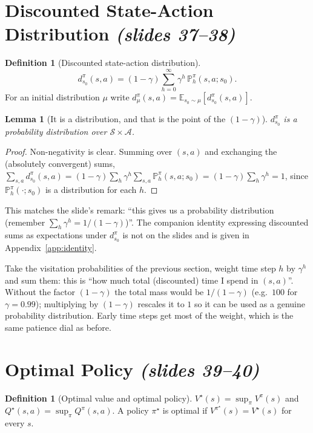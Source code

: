 \documentclass[11pt,a4paper]{article}
\newcommand{\E}{\mathbb{E}}
\newcommand{\PP}{\mathbb{P}}
\newcommand{\slr}[1]{\texorpdfstring{\emph{(slides #1)}}{(slides #1)}}
\newcommand{\cS}{\mathcal{S}}
\newcommand{\cA}{\mathcal{A}}
\theoremstyle{plain}
\newtheorem{lemma}[theorem]{Lemma}
\theoremstyle{definition}
\newtheorem{definition}[theorem]{Definition}
\theoremstyle{remark}
\begin{document}
\section{Discounted State-Action Distribution \slr{37--38}}
\begin{definition}[Discounted state-action distribution]\label{def:dsa}
\[
  d^\pi_{s_0}(s,a)=(1-\gamma)\sum_{h=0}^{\infty}\gamma^h\,\PP^\pi_h(s,a;s_0).
\]
For an initial distribution $\mu$ write $d^\pi_\mu(s,a)=\E_{s_0\sim\mu}[d^\pi_{s_0}(s,a)]$.
\end{definition}

\begin{lemma}[It is a distribution, and that is the point of the $(1-\gamma)$]\label{lem:dist}
$d^\pi_{s_0}$ is a probability distribution over $\cS\times\cA$.
\end{lemma}
\begin{proof}
Non-negativity is clear. Summing over $(s,a)$ and exchanging the (absolutely convergent) sums,
$\sum_{s,a}d^\pi_{s_0}(s,a)=(1-\gamma)\sum_h\gamma^h\sum_{s,a}\PP^\pi_h(s,a;s_0)=(1-\gamma)\sum_h\gamma^h=1$, since $\PP^\pi_h(\cdot;s_0)$ is a distribution for each $h$.
\end{proof}
This matches the slide's remark: ``this gives us a probability distribution (remember $\sum_h\gamma^h=1/(1-\gamma)$)''. The companion identity expressing discounted sums as expectations under $d^\pi_{s_0}$ is not on the slides and is given in Appendix~\ref{app:identity}.

\begin{intuition}
Take the visitation probabilities of the previous section, weight time step $h$ by $\gamma^h$ and sum them: this is ``how much total (discounted) time I spend in $(s,a)$''. Without the factor $(1-\gamma)$ the total mass would be $1/(1-\gamma)$ (e.g.\ $100$ for $\gamma=0.99$); multiplying by $(1-\gamma)$ rescales it to $1$ so it can be used as a genuine probability distribution. Early time steps get most of the weight, which is the same patience dial as before.
\end{intuition}

\section{Optimal Policy \slr{39--40}}
\begin{definition}[Optimal value and optimal policy]\label{def:opt}
$V^\star(s)=\sup_\pi V^\pi(s)$ and $Q^\star(s,a)=\sup_\pi Q^\pi(s,a)$. A policy $\pi^\star$ is optimal if $V^{\pi^\star}(s)=V^\star(s)$ for every $s$.
\end{definition}
\end{document}
